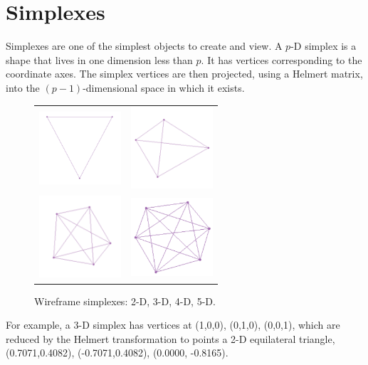 \section{Simplexes}

Simplexes are one of the simplest objects to create and view. A $p$-D
simplex is a shape that lives in one dimension less than $p$. It has
vertices corresponding to the coordinate axes. The simplex vertices
are then projected, using a Helmert matrix, into the
$(p - 1)$-dimensional space in which it exists.

\begin{figure}[ht]
\centering
\begin{tabular}{c c}
\includegraphics[width=1.2in]{fig/simplex2.pdf} & \includegraphics[width=1.2in]{fig/simplex3.pdf} \\
\includegraphics[width=1.2in]{fig/simplex4.pdf} & \includegraphics[width=1.2in]{fig/simplex5.pdf}
\end{tabular}

\caption{Wireframe simplexes: 2-D, 3-D, 4-D, 5-D.}
\end{figure}

For example, a 3-D simplex has vertices at (1,0,0), (0,1,0), (0,0,1),
which are reduced by the Helmert transformation to points a 2-D
equilateral triangle, (0.7071,0.4082), (-0.7071,0.4082), (0.0000,
-0.8165).


